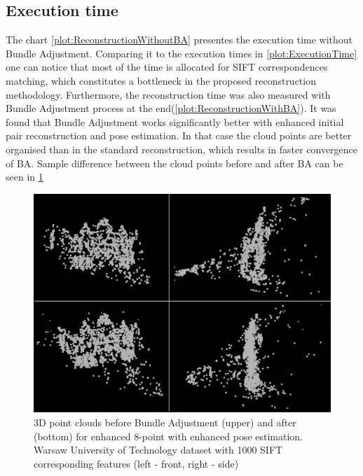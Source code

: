 \subsection{Execution time}
The chart \ref{plot:ReconstructionWithoutBA} presentes the execution time without Bundle Adjustment. Comparing it to the execution times in \ref{plot:ExecutionTime} one can notice that most of the time is allocated for SIFT correspondences matching, which constitutes a bottleneck in the proposed reconstruction methodology. Furthermore, the reconstruction time was also measured with Bundle Adjustment process at the end(\ref{plot:ReconstructionWithBA}). It was found that Bundle Adjustment works significantly better with enhanced initial pair reconstruction and pose estimation. In that case the cloud points are better organised than in the standard reconstruction, which results in faster convergence of BA. Sample difference between the cloud points before and after BA can be seen in \ref{fig:BundleAdjustmentComparison}
\begin{figure}[b!]
    \centering
    \includegraphics[width=\textwidth]{bundleAdjustmentComparison}
    \caption{3D point clouds before Bundle Adjustment (upper) and after (bottom) for enhanced 8-point with enhanced pose estimation. Warsaw University of Technology dataset with 1000 SIFT corresponding features (left - front, right - side)}
    \label{fig:BundleAdjustmentComparison}
\end{figure}
